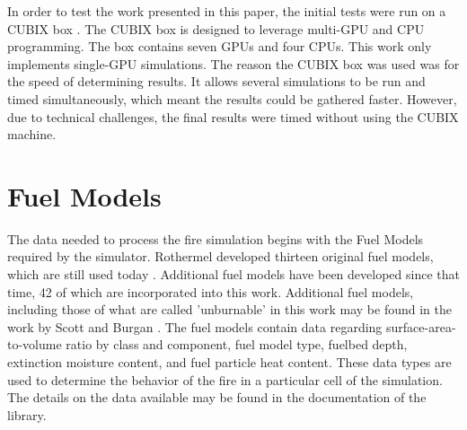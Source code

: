 In order to test the work presented in this paper, the initial tests were run on a CUBIX box \cite{cubix}. The CUBIX box is designed to leverage multi-GPU and CPU programming. The box contains seven GPUs and four CPUs. This work only implements single-GPU simulations. The reason the CUBIX box was used was for the speed of determining results. It allows several simulations to be run and timed simultaneously, which meant the results could be gathered faster. However, due to technical challenges, the final results were timed without using the CUBIX machine.

\section{Fuel Models}
The data needed to process the fire simulation begins with the Fuel Models required by the simulator. Rothermel developed thirteen original fuel models, which are still used today \cite{1983roth}. Additional fuel models have been developed since that time, 42 of which are incorporated into this work. Additional fuel models, including those of what are called 'unburnable' in this work may be found in the work by Scott and Burgan \cite{fuelmodels}.  The fuel models contain data regarding surface-area-to-volume ratio by class and component, fuel model type, fuelbed depth, extinction moisture content, and fuel particle heat content. These data types are used to determine the behavior of the fire in a particular cell of the simulation. The details on the data available may be found in the documentation of the library. 